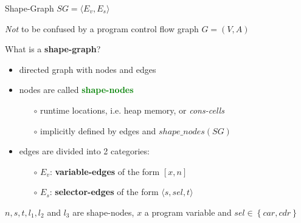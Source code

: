 \documentclass[xcolor={usenames,dvipsnames}]{beamer}
\begin{document}
\begin{frame}[fragile]{Shape-Graph $SG = \langle E_v, E_s \rangle$}

	\textit{Not} to be confused by a program control flow graph $G = (V, A)$
	
	
	\vspace{1em}
	What is a \textbf{shape-graph}?
	
	\begin{itemize}
	\item directed graph with nodes and edges
	\item nodes are called \textcolor{Green}{\textbf{shape-nodes}}
		\begin{itemize}
		\item[$\circ$] runtime locations, i.e. heap memory, or \textit{cons-cells}
		\item[$\circ$] implicitly defined by edges and $shape\_nodes(SG)$
		\end{itemize}
	\item edges are divided into 2 categories:
		\begin{itemize}
    	\item[$\circ$] \textcolor{VariableEdge}{$E_v$: \textbf{variable-edges}} of the form $ \left[x, n\right] $
    	\item[$\circ$] \textcolor{SelectorEdge}{$E_s$: \textbf{selector-edges}} of the form $ \langle s, sel, t \rangle $
		\end{itemize}
	\end{itemize}
	
	\begin{center}
  \end{center}
	
	$n, s, t, l_1, l_2$ and $l_3$ are shape-nodes, $x$ a program variable and $sel \in \left\{ car, cdr \right\}$

\end{frame}
\end{document}
